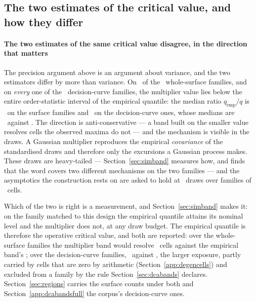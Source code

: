\subsection{The two estimates of the critical value, and how they differ}
\label{app:twoq}


\paragraph{The two estimates of the same critical value disagree, in the
direction that matters}
The precision argument above is an argument about variance, and the two
estimators differ by more than variance. On \nQbelowEmpWhole\ of the
\nFamiliesWhole\ whole-surface families, and on \emph{every} one of the
\nFamiliesDca\ decision-curve families, the multiplier value lies below the
entire order-statistic interval of the empirical quantile: the median ratio
$q_{\mathrm{emp}}/q$ is \qRatioWholeMedian\ on the surface families and
\qRatioDcaMedian\ on the decision-curve ones, whose medians are
\qDcaMedian\ against \qEmpDcaMedian. The direction is anti-conservative --- a
band built on the smaller value resolves cells the observed maxima do not ---
and the mechanism is visible in the draws. A Gaussian multiplier reproduces
the empirical \emph{covariance} of the standardised draws and therefore only
the excursions a Gaussian process makes. These draws are heavy-tailed ---
Section~\ref{sec:simband} measures how, and finds that the word covers two
different mechanisms on the two families --- and the asymptotics the
construction rests on are asked to hold at \nDrawsSurfaceMax\ draws over
families of \nCellsPerPairMedian\ cells.

Which of the two is right is a measurement, and Section~\ref{sec:simband}
makes it: on the family matched to this design the empirical quantile
attains its nominal level and the multiplier does not, at any draw budget.
The empirical quantile is therefore the operative critical value, and both
are reported: over the whole-surface families the multiplier band would
resolve \nResolvedWholeMult\ cells against the empirical band's
\nResolvedWholeEmp; over the decision-curve families, \nResolvedDcaMult\
against \nResolvedDcaEmp, the larger exposure, partly carried by cells that
are zero by arithmetic (Section~\ref{app:degencells}) and excluded from a
family by the rule Section~\ref{sec:dcabands} declares.
Section~\ref{sec:regions} carries the surface counts under both and
Section~\ref{app:dcabandsfull} the corpus's decision-curve ones.

